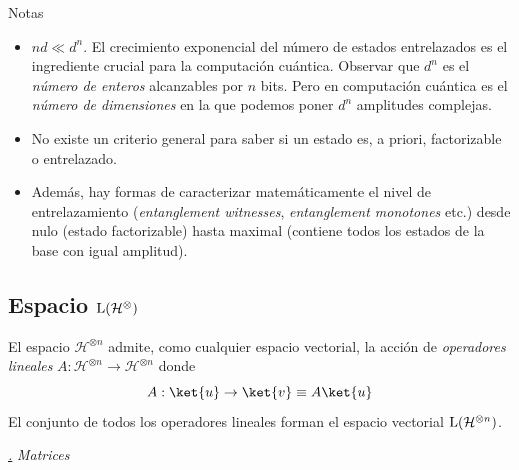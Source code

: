 \documentclass[a4paper,11pt]{book} %
\numberwithin{equation}{chapter}
\def\subsubiContadorIt{\par\addtocounter{subsubsection}{1}\underline{\it\thesubsubsection.}\hskip0.5cm \setcounter{subsubsubsectionIt}{0}}
\newcommand{\SubsubiIt}[1]{
		\subsubiContadorIt \textit{#1}
	}
\newcounter{subsubsubsectionIt}[subsubsection]
\begin{document}
\begin{mybox_blue}{Notas}
\begin{itemize}
	\item $nd \ll d^n$. El crecimiento exponencial del número de estados entrelazados es el ingrediente crucial para la computación cuántica. Observar que $d^n$ es el \textit{número de enteros} alcanzables por $n$ bits. Pero en computación cuántica es el \textit{número de dimensiones} en la que podemos poner $d^n$ amplitudes complejas.  
\vspace{0.2cm}

	\item No existe un criterio general para saber si un estado es, a priori, factorizable o entrelazado. 
\vspace{0.2cm}

	\item Además, hay formas de caracterizar matemáticamente el nivel de entrelazamiento (\textit{entanglement witnesses}, \textit{entanglement monotones} etc.) desde nulo (estado factorizable) hasta maximal (contiene todos los estados de la base con igual amplitud).
\end{itemize}
\end{mybox_blue}



		\subsection{Espacio ${\rm L}(\mathcal{H}^\otimes)$}

\begin{mybox_gray2}{}
El espacio $\mathcal{H}^{\otimes n}$ admite, como cualquier espacio vectorial, la acción de \textit{operadores lineales} $A: \mathcal{H}^{\otimes n} \to \mathcal{H}^{\otimes n}$ donde
	\begin{equation}
	A:\ket{u} \to \ket{v} \equiv A\ket{u}
	\end{equation}
El conjunto de todos los operadores lineales forman el espacio vectorial ${\rm L}(\mathcal{H}^{\otimes n})$.
\end{mybox_gray2}


			\SubsubiIt{Matrices}
\end{document}
